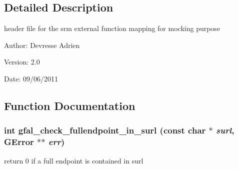 \subsection{Detailed Description}
header file for the srm external function mapping for mocking purpose 

\begin{Desc}
\item[Author:]Devresse Adrien \end{Desc}
\begin{Desc}
\item[Version:]2.0 \end{Desc}
\begin{Desc}
\item[Date:]09/06/2011 \end{Desc}


\subsection{Function Documentation}
\subsubsection{\setlength{\rightskip}{0pt plus 5cm}int gfal\_\-check\_\-fullendpoint\_\-in\_\-surl (const char $\ast$ {\em surl}, GError $\ast$$\ast$ {\em err})}\label{gfal__common__srm__internal__layer_8h_d12926fb068b66769f28f2c4fc177bd2}


return 0 if a full endpoint is contained in surl 